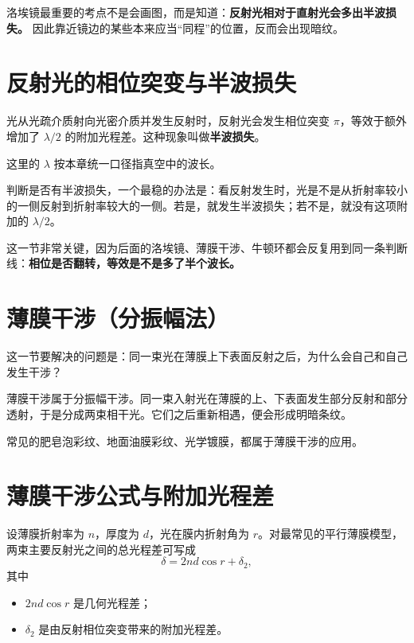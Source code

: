 \documentclass[lang=cn,11pt]{elegantbook}
\begin{document}
\begin{note}
洛埃镜最重要的考点不是会画图，而是知道：\textbf{反射光相对于直射光会多出半波损失。} 因此靠近镜边的某些本来应当“同程”的位置，反而会出现暗纹。
\end{note}

\section{反射光的相位突变与半波损失}

\begin{definition}[半波损失]\label{def:half-wave-loss}
光从光疏介质射向光密介质并发生反射时，反射光会发生相位突变 \(\pi\)，等效于额外增加了 \(\lambda/2\) 的附加光程差。这种现象叫做\textbf{半波损失}。
\end{definition}

这里的 \(\lambda\) 按本章统一口径指真空中的波长。

\begin{note}
判断是否有半波损失，一个最稳的办法是：看反射发生时，光是不是从折射率较小的一侧反射到折射率较大的一侧。若是，就发生半波损失；若不是，就没有这项附加的 \(\lambda/2\)。
\end{note}

\begin{remark}
这一节非常关键，因为后面的洛埃镜、薄膜干涉、牛顿环都会反复用到同一条判断线：\textbf{相位是否翻转，等效是不是多了半个波长。}
\end{remark}

\section{薄膜干涉（分振幅法）}

这一节要解决的问题是：同一束光在薄膜上下表面反射之后，为什么会自己和自己发生干涉？

薄膜干涉属于分振幅干涉。同一束入射光在薄膜的上、下表面发生部分反射和部分透射，于是分成两束相干光。它们之后重新相遇，便会形成明暗条纹。

常见的肥皂泡彩纹、地面油膜彩纹、光学镀膜，都属于薄膜干涉的应用。

\section{薄膜干涉公式与附加光程差}

设薄膜折射率为 \(n\)，厚度为 \(d\)，光在膜内折射角为 \(r\)。对最常见的平行薄膜模型，两束主要反射光之间的总光程差可写成
\[
\delta=2nd\cos r+\delta_2,
\]
其中
\begin{itemize}
  \item \(2nd\cos r\) 是几何光程差；
  \item \(\delta_2\) 是由反射相位突变带来的附加光程差。
\end{itemize}
\end{document}
